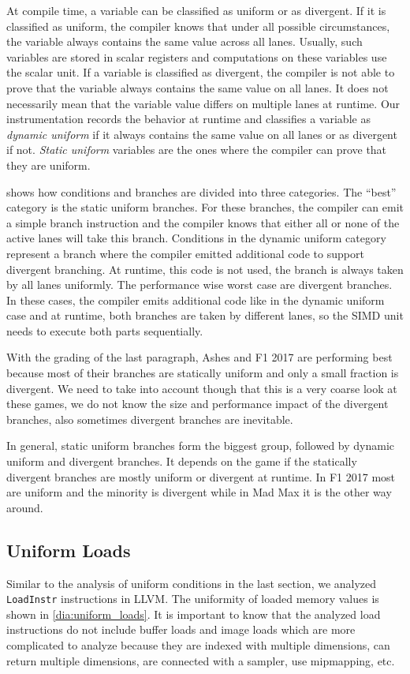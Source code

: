 At compile time, a variable can be classified as uniform or as divergent.
If it is classified as uniform, the compiler knows that under all possible circumstances, the variable always contains the same value across all lanes.
Usually, such variables are stored in scalar registers and computations on these variables use the scalar unit.
If a variable is classified as divergent, the compiler is not able to prove that the variable always contains the same value on all lanes.
It does not necessarily mean that the variable value differs on multiple lanes at runtime.
Our instrumentation records the behavior at runtime and classifies a variable as \emph{dynamic uniform} if it always contains the same value on all lanes or as divergent if not.
\emph{Static uniform} variables are the ones where the compiler can prove that they are uniform.



 shows how conditions and branches are divided into three categories.
The \enquote{best} category is the static uniform branches.
For these branches, the compiler can emit a simple branch instruction and the compiler knows that either all or none of the active lanes will take this branch.
Conditions in the dynamic uniform category represent a branch where the compiler emitted additional code to support divergent branching.
At runtime, this code is not used, the branch is always taken by all lanes uniformly.
The performance wise worst case are divergent branches.
In these cases, the compiler emits additional code like in the dynamic uniform case and at runtime, both branches are taken by different lanes, so the SIMD unit needs to execute both parts sequentially.

With the grading of the last paragraph, Ashes and F1 2017 are performing best because most of their branches are statically uniform and only a small fraction is divergent.
We need to take into account though that this is a very coarse look at these games, we do not know the size and performance impact of the divergent branches, also sometimes divergent branches are inevitable.

In general, static uniform branches form the biggest group, followed by dynamic uniform and divergent branches.
It depends on the game if the statically divergent branches are mostly uniform or divergent at runtime.
In F1 2017 most are uniform and the minority is divergent while in Mad Max it is the other way around.

\subsection{Uniform Loads}
\label{sub:eval_uniform_loads}
Similar to the analysis of uniform conditions in the last section, we analyzed \texttt{LoadInstr} instructions in LLVM.
The uniformity of loaded memory values is shown in \cref{dia:uniform_loads}.
It is important to know that the analyzed load instructions do not include buffer loads and image loads which are more complicated to analyze because they are indexed with multiple dimensions, can return multiple dimensions, are connected with a sampler, use mipmapping, etc.


